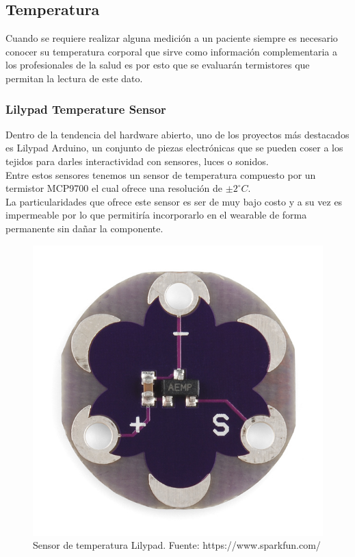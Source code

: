 \subsection{Temperatura}
Cuando se requiere realizar alguna medición a un paciente siempre es necesario conocer su temperatura corporal que sirve como información complementaria a los profesionales de la salud es por esto que se evaluarán termistores que permitan la lectura de este dato.
\subsubsection{Lilypad Temperature Sensor}
Dentro de la tendencia del hardware abierto, uno de los proyectos más destacados es Lilypad Arduino, un conjunto de piezas electrónicas que se pueden coser a los tejidos para darles interactividad con sensores, luces o sonidos.\\
Entre estos sensores tenemos un sensor de temperatura compuesto por un termistor MCP9700 el cual ofrece una resolución de $\pm2^\circ C.$\\

\newpage
La particularidades que ofrece este sensor es ser de muy bajo costo y a su vez es impermeable por lo que permitiría incorporarlo en el wearable de forma permanente sin dañar la componente.

\begin{figure}[H]
	\centering
	\includegraphics[scale=0.7]{figuras/sensor/t/lilypad.jpg}
	\caption{Sensor de temperatura Lilypad. Fuente: https://www.sparkfun.com/}
	\label{Lilypad}
\end{figure}

